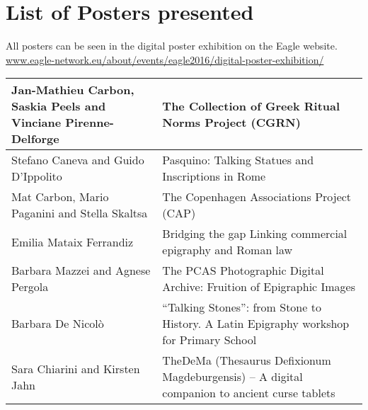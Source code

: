 
\chapter{List of Posters presented}\label{posterslist}

\begin{sloppypar}
All posters can be seen in the digital poster exhibition on the Eagle website.
\url{www.eagle-network.eu/about/events/eagle2016/digital-poster-exhibition/}

\end{sloppypar}

\begin{table}
{\small
\addtolength{\tabcolsep}{-0.8mm}

\begin{tabular*}{\textwidth}{p{4.5cm}|p{6cm}}
%    
%    
%
%    
%   
\toprule Jan-Mathieu Carbon, Saskia Peels and Vinciane Pirenne-Delforge & The Collection of Greek Ritual Norms Project (CGRN) \\\hline
Stefano Caneva and Guido D'Ippolito & Pasquino: Talking Statues and Inscriptions in Rome\\\hline
Mat Carbon, Mario Paganini and Stella Skaltsa & The Copenhagen Associations Project (CAP)\\\hline
Emilia Mataix Ferrandiz & Bridging the gap Linking commercial epigraphy and Roman law\\\hline
Barbara Mazzei and Agnese Pergola & The PCAS Photographic Digital Archive: Fruition of Epigraphic Images\\\hline
Barbara De Nicolò & “Talking Stones”: from Stone to History. A Latin Epigraphy workshop for Primary School\\\hline
Sara Chiarini and Kirsten Jahn & TheDeMa (Thesaurus Defixionum Magdeburgensis) – A digital companion to ancient curse tablets\\\hline

\end{tabular*}}
\end{table}
